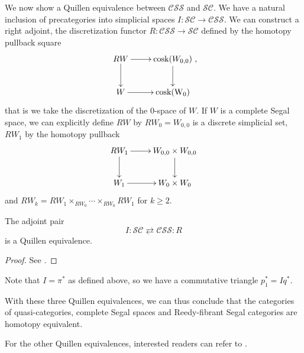 \begin{refsection}
We now show a Quillen equivalence between $\mathcal{CSS}$ and $\mathcal{SC}$. We have a natural inclusion of precategories into simplicial spaces $I:\mathcal{SC}\to\mathcal{CSS}$. We can construct a right adjoint, the discretization functor $R:\mathcal{CSS}\to\mathcal{SC}$ defined by the homotopy pullback square
$$\xymatrix{RW\ar[r]\ar[d]&\mathrm{cosk}(W_{0,0})\ar[d]\\W\ar[r]&\mathrm{cosk(W_0)}},$$
that is we take the discretization of the 0-space of $W$. If $W$ is a complete Segal space, we can explicitly define $RW$ by $RW_0=W_{0,0}$ is a discrete simplicial set, $RW_1$ by the homotopy pullback
$$\xymatrix{RW_1\ar[r]\ar[d]&W_{0,0}\times W_{0,0}\ar[d]\\W_1\ar[r]&W_0\times W_0}$$
and $RW_k=RW_1\times_{RW_0}\cdots\times_{RW_0}RW_1$ for $k\ge2$.

\begin{thm}
The adjoint pair
$$I:\mathcal{SC}\rightleftarrows\mathcal{CSS}:R$$
is a Quillen equivalence.
\end{thm}

\begin{proof}
See \cite{bergner3}.
\end{proof}

Note that $I=\pi^*$ as defined above, so we have a commutative triangle $p_1^*=Iq^*$.

With these three Quillen equivalences, we can thus conclude that the categories of quasi-categories, complete Segal spaces and Reedy-fibrant Segal categories are homotopy equivalent.

For the other Quillen equivalences, interested readers can refer to \cite{hs}.

\printbibliography[heading = local]

\end{refsection}
